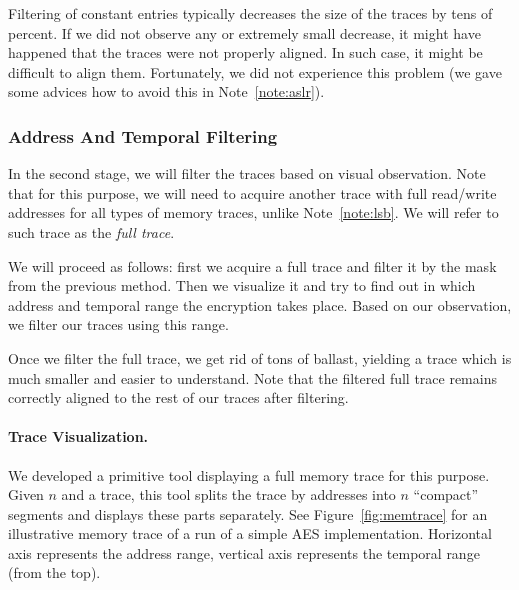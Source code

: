 	\begin{note}
	\label{note:filter}
		Filtering of constant entries typically decreases the size of the traces by tens of percent. If we did not observe any or extremely small decrease, it might have happened that the traces were not properly aligned. In such case, it might be difficult to align them. Fortunately, we did not experience this problem (we gave some advices how to avoid this in Note~\ref{note:aslr}).
	\end{note}

\subsubsection{Address And Temporal Filtering}
\label{subsec:atf}
	
	In the second stage, we will filter the traces based on visual observation. Note that for this purpose, we will need to acquire another trace with full read/write addresses for all types of memory traces, unlike Note~\ref{note:lsb}. We will refer to such trace as the {\em full trace}.
	
	We will proceed as follows: first we acquire a full trace and filter it by the mask from the previous method. Then we visualize it and try to find out in which address and temporal range the encryption takes place. Based on our observation, we filter our traces using this range.
	
	\begin{note}
	\label{note:fullfilter}
		Once we filter the full trace, we get rid of tons of ballast, yielding a trace which is much smaller and easier to understand. Note that the filtered full trace remains correctly aligned to the rest of our traces after filtering.
	\end{note}
	
	\paragraph{Trace Visualization.}
		
		We developed a primitive tool displaying a full memory trace for this purpose. Given $n$ and a trace, this tool splits the trace by addresses into $n$ ``compact'' segments and displays these parts separately. See Figure~\ref{fig:memtrace} for an illustrative memory trace of a run of a simple AES implementation. Horizontal axis represents the address range, vertical axis represents the temporal range (from the top).
		
